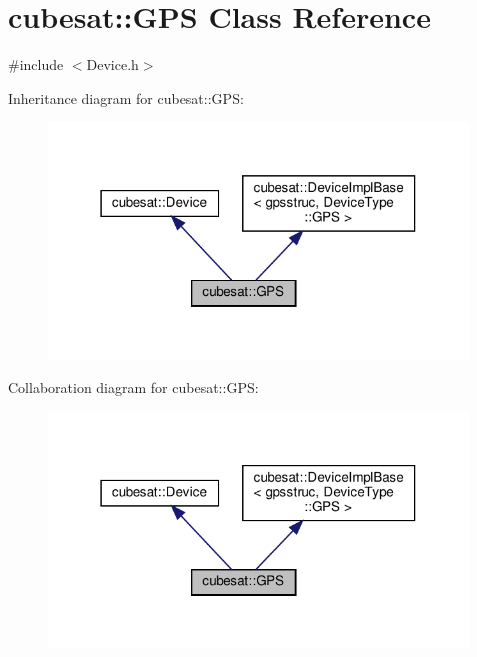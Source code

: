 \hypertarget{classcubesat_1_1GPS}{}\section{cubesat\+:\+:G\+PS Class Reference}
\label{classcubesat_1_1GPS}


{\ttfamily \#include $<$Device.\+h$>$}



Inheritance diagram for cubesat\+:\+:G\+PS\+:
\nopagebreak
\begin{figure}[H]
\begin{center}
\leavevmode
\includegraphics[width=316pt]{classcubesat_1_1GPS__inherit__graph}
\end{center}
\end{figure}


Collaboration diagram for cubesat\+:\+:G\+PS\+:
\nopagebreak
\begin{figure}[H]
\begin{center}
\leavevmode
\includegraphics[width=316pt]{classcubesat_1_1GPS__coll__graph}
\end{center}
\end{figure}
